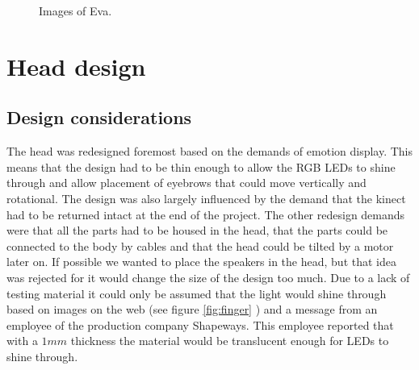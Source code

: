 \documentclass[technical_document.tex]{subfiles}
\begin{document}
 \begin{figure}[h!]
  \centering
  \hspace{2mm}            
  \caption{Images of Eva.}
  \label{Eva}
\end{figure}

\section{Head design}
\subsection*{Design considerations}
The head was redesigned foremost based on the demands of emotion display. This means that the design had to be thin enough 
to allow the RGB LEDs to shine through and allow placement of eyebrows that could move vertically and rotational. The 
design was also largely influenced by the demand that the kinect had to be returned intact at the end of the project. The 
other redesign demands were that all the parts had to be housed in the head, that the parts could be connected to the body 
by cables and that the head could be tilted by a motor later on. If possible we wanted  to place the speakers in the head, 
but that idea was rejected for it would change the size of the design too much. Due to a lack of testing material it could only be assumed that the light would shine through based on images on the web (see figure \ref{fig:finger} ) and a message 
from an employee of the production company Shapeways. This employee reported that with a $1 mm$ thickness the material would 
be translucent enough for LEDs to shine through.
\end{document}
